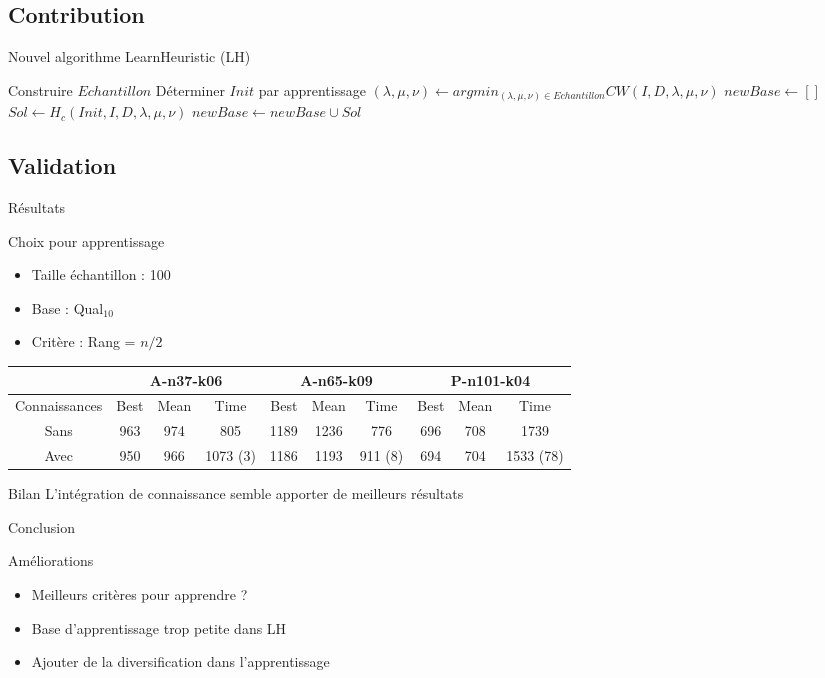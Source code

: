 \documentclass{beamer}
\begin{document}
\subsection{Contribution}
\begin{frame}{Nouvel algorithme}
LearnHeuristic (LH)
\begin{algorithm}[H]
\DontPrintSemicolon %
Construire $Echantillon$\;
Déterminer $Init$ par apprentissage\;
$(\lambda,\mu,\nu) \gets argmin_{(\lambda,\mu,\nu) \in Echantillon}CW(I,D,\lambda,\mu,\nu)$\;
$newBase \gets []$\;
 {
	 {
		$Sol \gets H_c(Init,I,D,\lambda,\mu,\nu)$\;
		$newBase \gets newBase \cup Sol$\;
	}
}
\;
\end{algorithm}
\end{frame}

\subsection{Validation}
\begin{frame}{Résultats}

\begin{block}{Choix pour apprentissage}
\begin{itemize}
\item Taille échantillon : 100
\item Base : Qual$_{10}$
\item Critère : Rang = $n/2$
\end{itemize}

\end{block}
\begin{table}[H]

\begin{tabular}{|@{}c@{}|@{}c@{}|@{}c@{}|@{}c@{}|@{}c@{}|@{}c@{}|@{}c@{}|@{}c@{}|@{}c@{}|@{}c@{}|}
   \hline
    & \multicolumn{3}{c|}{A-n37-k06} & \multicolumn{3}{c|}{A-n65-k09} & \multicolumn{3}{c|}{P-n101-k04} \\
   \hline
   Connaissances & Best & Mean & Time & Best & Mean & Time & Best & Mean & Time \\
   \hline
   Sans &  963 & 974 & 805 & 1189 & 1236 & 776 & 696 & 708 & 1739  \\   
   \hline
   Avec & 950 & 966 & 1073 (3) & 1186 & 1193 & 911 (8) & 694 & 704 & 1533 (78) \\
   \hline
\end{tabular}
\end{table}
\begin{exampleblock}{Bilan}
L'intégration de connaissance semble apporter de meilleurs résultats
\end{exampleblock}
\end{frame}

\begin{frame}{Conclusion}
\begin{block}{Améliorations}
\begin{itemize}
\item Meilleurs critères pour apprendre ?
\item Base d'apprentissage trop petite dans LH
\item Ajouter de la diversification dans l'apprentissage
\end{itemize}
\end{block}
\end{frame}
\end{document}
